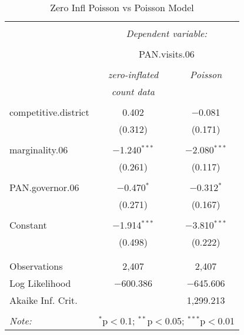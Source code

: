 \begin{table}[!htbp] \centering 
  \caption{Zero Infl Poisson vs Poisson Model} 
  \label{tbl:zip:pois} 
\begin{tabular}{@{\extracolsep{5pt}}lcc} 
\\[-1.8ex]\hline 
\hline \\[-1.8ex] 
 & \multicolumn{2}{c}{\textit{Dependent variable:}} \\ 
\cline{2-3} 
\\[-1.8ex] & \multicolumn{2}{c}{PAN.visits.06} \\ 
\\[-1.8ex] & \textit{zero-inflated} & \textit{Poisson} \\ 
 & \textit{count data} & \textit{} \\ 
\hline \\[-1.8ex] 
 competitive.district & 0.402 & $-$0.081 \\ 
  & (0.312) & (0.171) \\ 
  & & \\ 
 marginality.06 & $-$1.240$^{***}$ & $-$2.080$^{***}$ \\ 
  & (0.261) & (0.117) \\ 
  & & \\ 
 PAN.governor.06 & $-$0.470$^{*}$ & $-$0.312$^{*}$ \\ 
  & (0.271) & (0.167) \\ 
  & & \\ 
 Constant & $-$1.914$^{***}$ & $-$3.810$^{***}$ \\ 
  & (0.498) & (0.222) \\ 
  & & \\ 
\hline \\[-1.8ex] 
Observations & 2,407 & 2,407 \\ 
Log Likelihood & $-$600.386 & $-$645.606 \\ 
Akaike Inf. Crit. &  & 1,299.213 \\ 
\hline 
\hline \\[-1.8ex] 
\textit{Note:}  & \multicolumn{2}{r}{$^{*}$p$<$0.1; $^{**}$p$<$0.05; $^{***}$p$<$0.01} \\ 
\end{tabular} 
\end{table}  

